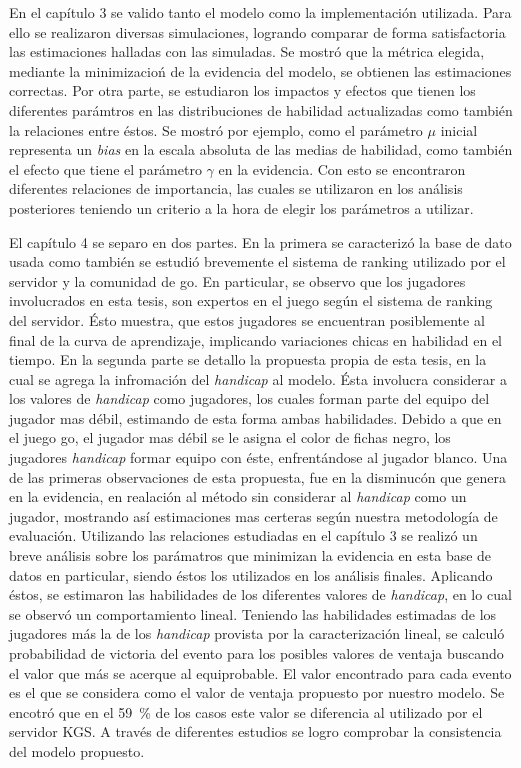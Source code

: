 \documentclass[11pt,twoside,spanish]{report} %
\begin{document}
En el cap\'itulo 3 se valido tanto el modelo como la implementaci\'on utilizada.
Para ello se realizaron diversas simulaciones, logrando comparar de forma satisfactoria las estimaciones halladas con las simuladas.
Se mostr\'o que la m\'etrica elegida, mediante la minimizacio\'n de la evidencia del modelo, se obtienen las estimaciones correctas.
Por otra parte, se estudiaron los impactos y efectos que tienen los diferentes par\'amtros en las distribuciones de habilidad actualizadas como tambi\'en la relaciones entre \'estos.
Se mostr\'o por ejemplo, como el par\'ametro $\mu$ inicial representa un \textit{bias} en la escala absoluta de las medias de habilidad, como tambi\'en el efecto que tiene el par\'ametro $\gamma$ en la evidencia.
Con esto se encontraron diferentes relaciones de importancia, las cuales se utilizaron en los an\'alisis posteriores teniendo un criterio a la hora de elegir los par\'ametros a utilizar.


El cap\'itulo 4 se separo en dos partes.
En la primera se caracteriz\'o la base de dato usada como tambi\'en se estudi\'o brevemente el sistema de ranking utilizado por el servidor y la comunidad de go.
En particular, se observo que los jugadores involucrados en esta tesis, son expertos en el juego seg\'un el sistema de ranking del servidor.
\'Esto muestra, que estos jugadores se encuentran posiblemente al final de la curva de aprendizaje, implicando variaciones chicas en habilidad en el tiempo.
En la segunda parte se detallo la propuesta propia de esta tesis, en la cual se agrega la infromaci\'on del \textit{handicap} al modelo.
\'Esta involucra considerar a los valores de \textit{handicap} como jugadores, los cuales forman parte del equipo del jugador mas d\'ebil, estimando de esta forma ambas habilidades.
Debido a que en el juego go, el jugador mas d\'ebil se le asigna el color de fichas negro, los jugadores  \textit{handicap} formar equipo con \'este, enfrent\'andose al jugador blanco.
Una de las primeras observaciones de esta propuesta, fue en la disminuc\'on que genera en la evidencia, en realaci\'on al m\'etodo sin considerar al \textit{handicap} como un jugador, mostrando as\'i estimaciones mas certeras seg\'un nuestra metodolog\'ia de evaluaci\'on.
Utilizando las relaciones estudiadas en el cap\'itulo 3 se realiz\'o un breve an\'alisis sobre los par\'amatros que minimizan la evidencia en esta base de datos en particular, siendo \'estos los utilizados en los an\'alisis finales.
Aplicando \'estos, se estimaron las habilidades de los diferentes valores de \textit{handicap}, en lo cual se observ\'o un comportamiento lineal.
Teniendo las habilidades estimadas de los jugadores m\'as la de los \textit{handicap} provista por la caracterizaci\'on lineal, se calcul\'o probabilidad de victoria del evento para los posibles valores de ventaja buscando el valor que m\'as se acerque al equiprobable.
El valor encontrado para cada evento es el que se considera como el valor de ventaja propuesto por nuestro modelo.
Se encotr\'o que en el \SI{59}{\percent} de los casos este valor se diferencia al utilizado por el servidor KGS.
A trav\'es de diferentes estudios se logro comprobar la consistencia del modelo propuesto.
\end{document}
